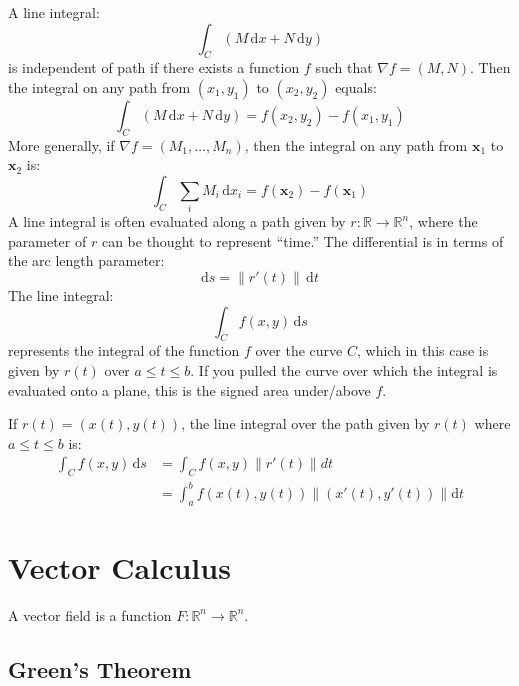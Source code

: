 \documentclass{article}
\begin{document}
A line integral:
\begin{equation*}
    \int_C (M \,\mathrm{d}x+N \,\mathrm{d}y)
\end{equation*}
is independent of path if there exists a function $f$ such that $\nabla f=(M,N)$. Then the integral on any path from $(x_1,y_1)$ to $(x_2,y_2)$ equals:
\begin{equation*}
    \int_C (M \,\mathrm{d}x+N \,\mathrm{d}y)
	=f(x_2,y_2)-f(x_1,y_1)
\end{equation*}
More generally, if $\nabla f=(M_1,\ldots, M_n)$, then the integral on any path from $\mathbf x_1$ to $\mathbf x_2$ is:
\begin{equation*}
    \int_C \sum_i M_i \,\mathrm{d}x_i
	=f(\mathbf x_2)-f(\mathbf x_1)
\end{equation*}
A line integral is often evaluated along a path given by $r:\mathbb R\to\mathbb R^n$, where the parameter of $r$ can be thought to represent ``time.'' The differential is in terms of the arc length parameter:
\begin{equation*}
    \mathrm{d}s=\lVert r'(t) \rVert \,\mathrm{d}t
\end{equation*}
The line integral:
\begin{equation*}
    \int_C f(x,y) \,\mathrm{d}s
\end{equation*}
represents the integral of the function $f$ over the curve $C$, which in this case is given by $r(t)$ over $a\leq t\leq b$. If you pulled the curve over which the integral is evaluated onto a plane, this is the signed area under/above $f$.

If $r(t)=(x(t), y(t))$, the line integral over the path given by $r(t)$ where $a\leq t\leq b$ is:
\begin{align*}
    \int_C f(x,y) \,\mathrm{d}s
	&=\int_C f(x,y) \lVert r'(t) \rVert dt \\
	&=\int_a^b f(x(t),y(t)) \lVert (x'(t), y'(t)) \rVert \mathrm{d}t
\end{align*}

\section{Vector Calculus}

A vector field is a function $F:\mathbb R^n\to\mathbb R^n$.

\subsection{Green's Theorem}
\end{document}
